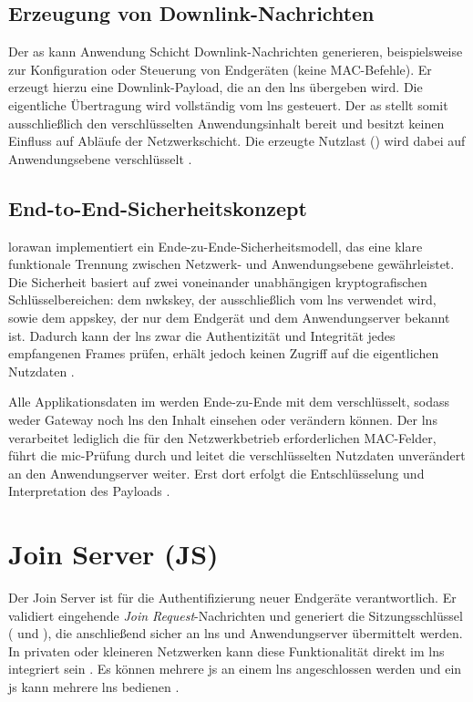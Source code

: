 \subsection{Erzeugung von Downlink-Nachrichten}

Der \ac{as} kann Anwendung Schicht Downlink-Nachrichten generieren, beispielsweise zur Konfiguration oder Steuerung von Endgeräten (keine MAC-Befehle). Er erzeugt hierzu eine Downlink-Payload, die an den \ac{lns} übergeben wird. Die eigentliche Übertragung wird vollständig vom \ac{lns} gesteuert. Der \ac{as} stellt somit ausschlie{\ss}lich den verschlüsselten Anwendungsinhalt bereit und besitzt keinen Einfluss auf Abläufe der Netzwerkschicht. Die erzeugte Nutzlast () wird dabei auf Anwendungsebene verschlüsselt \cite{LoRaAlliance:2020c}.

\subsection{End-to-End-Sicherheitskonzept}

\ac{lorawan} implementiert ein Ende-zu-Ende-Sicherheitsmodell, das eine klare funktionale Trennung zwischen Netzwerk- und Anwendungsebene gewährleistet. Die Sicherheit basiert auf zwei voneinander unabhängigen kryptografischen Schlüsselbereichen: dem \ac{nwkskey}, der ausschlie{\ss}lich vom \ac{lns} verwendet wird, sowie dem \ac{appskey}, der nur dem Endgerät und dem Anwendungserver bekannt ist. Dadurch kann der \ac{lns} zwar die Authentizität und Integrität jedes empfangenen Frames prüfen, erhält jedoch keinen Zugriff auf die eigentlichen Nutzdaten \cite{LoRaAlliance:2020b}.

Alle Applikationsdaten im  werden Ende-zu-Ende mit dem  verschlüsselt, sodass weder Gateway noch \ac{lns} den Inhalt einsehen oder verändern können. Der \ac{lns} verarbeitet lediglich die für den Netzwerkbetrieb erforderlichen MAC-Felder, führt die \ac{mic}-Prüfung durch und leitet die verschlüsselten Nutzdaten unverändert an den Anwendungserver weiter. Erst dort erfolgt die Entschlüsselung und Interpretation des Payloads \cite{LoRaAlliance:2020b, Montagny:2022}. 

\section{Join Server (JS)}

Der Join Server ist für die Authentifizierung neuer Endgeräte verantwortlich. Er validiert eingehende \textit{Join Request}-Nachrichten und generiert die Sitzungsschlüssel ( und ), die anschlie{\ss}end sicher an \ac{lns} und Anwendungserver übermittelt werden. In privaten oder kleineren Netzwerken kann diese Funktionalität direkt im \ac{lns} integriert sein \cite{Semtech:2024} \cite{LoRaAlliance:2020b}. Es können mehrere \ac{js} an einem \ac{lns} angeschlossen werden und ein \ac{js} kann mehrere \ac{lns} bedienen \cite{LoRaAlliance:2020c}.


